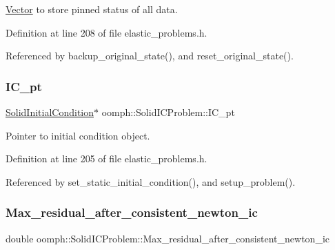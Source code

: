 \hyperlink{classoomph_1_1Vector}{Vector} to store pinned status of all data. 



Definition at line 208 of file elastic\+\_\+problems.\+h.



Referenced by backup\+\_\+original\+\_\+state(), and reset\+\_\+original\+\_\+state().

\mbox{\label{classoomph_1_1SolidICProblem_ac69ec7322cfe32c7c6a0a82a0ce0ff0d}} 
\subsubsection{\texorpdfstring{I\+C\+\_\+pt}{IC\_pt}}
{\footnotesize\ttfamily \hyperlink{classoomph_1_1SolidInitialCondition}{Solid\+Initial\+Condition}$\ast$ oomph\+::\+Solid\+I\+C\+Problem\+::\+I\+C\+\_\+pt\hspace{0.3cm}{\ttfamily [private]}}



Pointer to initial condition object. 



Definition at line 205 of file elastic\+\_\+problems.\+h.



Referenced by set\+\_\+static\+\_\+initial\+\_\+condition(), and setup\+\_\+problem().

\mbox{\label{classoomph_1_1SolidICProblem_a8351e8422adab7110c7a2a41494b226b}} 
\subsubsection{\texorpdfstring{Max\+\_\+residual\+\_\+after\+\_\+consistent\+\_\+newton\+\_\+ic}{Max\_residual\_after\_consistent\_newton\_ic}}
{\footnotesize\ttfamily double oomph\+::\+Solid\+I\+C\+Problem\+::\+Max\+\_\+residual\+\_\+after\+\_\+consistent\+\_\+newton\+\_\+ic\hspace{0.3cm}{\ttfamily [private]}}



